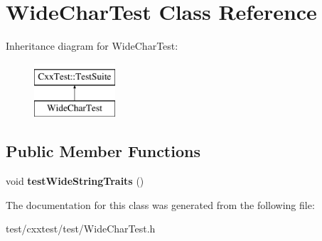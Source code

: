 \hypertarget{classWideCharTest}{\section{Wide\-Char\-Test Class Reference}
\label{classWideCharTest}
}
Inheritance diagram for Wide\-Char\-Test\-:\begin{figure}[H]
\begin{center}
\leavevmode
\includegraphics[height=2.000000cm]{classWideCharTest}
\end{center}
\end{figure}
\subsection*{Public Member Functions}
\begin{DoxyCompactItemize}
\item 
\hypertarget{classWideCharTest_a99f0d289b0b46782b22b231a204e731b}{void {\bfseries test\-Wide\-String\-Traits} ()}\label{classWideCharTest_a99f0d289b0b46782b22b231a204e731b}

\end{DoxyCompactItemize}


The documentation for this class was generated from the following file\-:\begin{DoxyCompactItemize}
\item 
test/cxxtest/test/Wide\-Char\-Test.\-h\end{DoxyCompactItemize}
